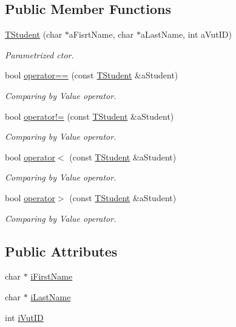 \subsection*{Public Member Functions}
\begin{DoxyCompactItemize}
\item 
\hyperlink{struct_c_value___t_student_1_1_t_student_ae052eac687165ae925ca2a15bccc9d95}{T\+Student} (char $\ast$a\+Fisrt\+Name, char $\ast$a\+Last\+Name, int a\+Vut\+ID)
\begin{DoxyCompactList}\small\item\em Parametrized c\textquotesingle{}tor. \end{DoxyCompactList}\item 
bool \hyperlink{struct_c_value___t_student_1_1_t_student_ac12071cfbbb72f3666833d7da227f052}{operator==} (const \hyperlink{struct_c_value___t_student_1_1_t_student}{T\+Student} \&a\+Student)
\begin{DoxyCompactList}\small\item\em Comparing by Value operator. \end{DoxyCompactList}\item 
bool \hyperlink{struct_c_value___t_student_1_1_t_student_aaadc7d5525e434de77c6874052174903}{operator!=} (const \hyperlink{struct_c_value___t_student_1_1_t_student}{T\+Student} \&a\+Student)
\begin{DoxyCompactList}\small\item\em Comparing by Value operator. \end{DoxyCompactList}\item 
bool \hyperlink{struct_c_value___t_student_1_1_t_student_a0e70d174799ef62209bfd2719077f127}{operator$<$} (const \hyperlink{struct_c_value___t_student_1_1_t_student}{T\+Student} \&a\+Student)
\begin{DoxyCompactList}\small\item\em Comparing by Value operator. \end{DoxyCompactList}\item 
bool \hyperlink{struct_c_value___t_student_1_1_t_student_ae31809572b52d475b4e891b2a4acaafd}{operator$>$} (const \hyperlink{struct_c_value___t_student_1_1_t_student}{T\+Student} \&a\+Student)
\begin{DoxyCompactList}\small\item\em Comparing by Value operator. \end{DoxyCompactList}\end{DoxyCompactItemize}
\subsection*{Public Attributes}
\begin{DoxyCompactItemize}
\item 
char $\ast$ \hyperlink{struct_c_value___t_student_1_1_t_student_a5eb1830e69db30e4e2a54d6bdc3f649f}{i\+First\+Name}
\item 
char $\ast$ \hyperlink{struct_c_value___t_student_1_1_t_student_a00b625fc49750e98e28e9d0d013bba66}{i\+Last\+Name}
\item 
int \hyperlink{struct_c_value___t_student_1_1_t_student_aaf7deea3a78dc217d85b4e23f677150f}{i\+Vut\+ID}
\end{DoxyCompactItemize}


